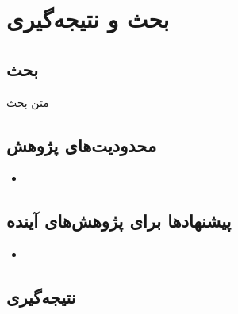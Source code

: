 
\chapter{بحث و نتیجه‌گیری}
\section{بحث}
متن بحث
\section{محدودیت‌های پژوهش}
\begin{itemize}
  \item
\end{itemize}

\section{پیشنهادها برای پژوهش‌های آینده}
\begin{itemize}
  \item
\end{itemize}

\section{نتیجه‌گیری}

\clearpage
